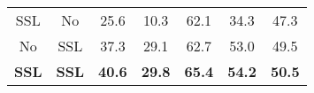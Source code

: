 \documentclass{article} \usepackage{iclr2023_conference,times}
\begin{document}
\begin{table}[h]
\begin{tabular}{@{}ccccccc@{}}
SSL                                                               & No                                                              & 25.6                                                  & 10.3                                                     & 62.1                                                  & 34.3                                                     & 47.3                                                     \\
No                                                                & SSL                                                             & 37.3                                                  & 29.1                                                     & 62.7                                                  & 53.0                                                     & 49.5                                                  \\
\textbf{SSL}                                                      & \textbf{SSL}                                                    & \textbf{40.6}                                         & \textbf{29.8}                                            & \textbf{65.4}                                         & \textbf{54.2}                                            & \textbf{50.5}                                         \\ \bottomrule
\end{tabular}
\end{table}
\end{document}
